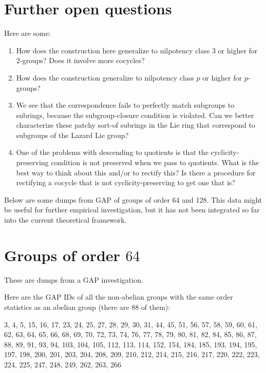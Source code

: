 \documentclass[10pt]{amsart}
\begin{document}
\section{Further open questions}

Here are some:

\begin{enumerate}
\item How does the construction here generalize to nilpotency class
  $3$ or higher for $2$-groups? Does it involve more cocycles?
\item How does the construction generalize to nilpotency class $p$ or
  higher for $p$-groups?
\item We see that the correspondence fails to perfectly match
  subgroups to subrings, because the subgroup-closure condition is
  violated. Can we better characterize these patchy sort-of subrings
  in the Lie ring that correspond to subgroups of the Lazard Lie group?
\item One of the problems with descending to quotients is that the
  cyclicity-preserving condition is not preserved when we pass to
  quotients. What is the best way to think about this and/or to
  rectify this? Is there a procedure for rectifying a cocycle that is
  not cyclicity-preserving to get one that is?
\end{enumerate}

\newpage
\appendix

Below are some dumps from GAP of groups of order 64 and 128. This data
might be useful for further empirical investigation, but it has not
been integrated so far into the current theoretical framework.

\section{Groups of order $64$}

These are dumps from a GAP investigation.

Here are the GAP IDs of all the non-abelian groups with the same order
statistics as an abelian group (there are 88 of them):

3, 4, 5, 15, 16, 17, 23, 24, 25, 27, 28, 29, 30, 31, 44, 45, 51, 56,
57, 58, 59, 60, 61, 62, 63, 64, 65, 66, 68, 69, 70, 72, 73, 74, 76,
77, 78, 79, 80, 81, 82, 84, 85, 86, 87, 88, 89, 91, 93, 94, 103,
104, 105, 112, 113, 114, 152, 154, 184, 185, 193, 194, 195, 197,
198, 200, 201, 203, 204, 208, 209, 210, 212, 214, 215, 216, 217,
220, 222, 223, 224, 225, 247, 248, 249, 262, 263, 266
\end{document}
